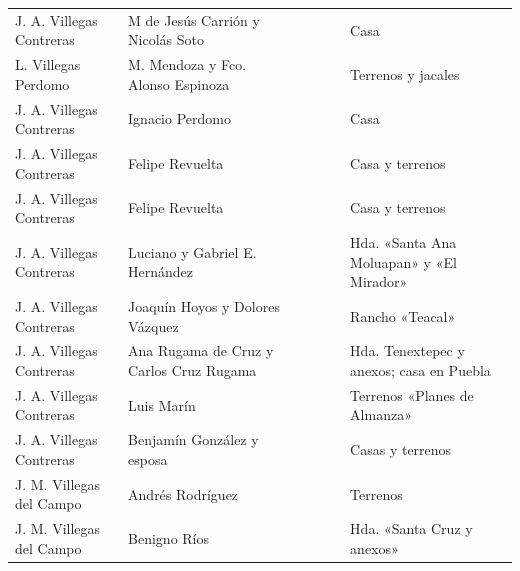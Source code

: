 \documentclass[14pt,twoside,final]{extbook} %
\begin{document}
{\begin{longtable}[c]{@{}p{2.5cm}lrSrrl@{}}
J. A. Villegas Contreras & M de Jesús Carrión y Nicolás Soto &  &  & {} & {} & Casa \\
L. Villegas Perdomo & M. Mendoza y Fco. Alonso Espinoza &  & {} & {} & {} & Terrenos y jacales \\
J. A. Villegas Contreras & Ignacio Perdomo &  &  &  &  & Casa \\
J. A. Villegas Contreras & Felipe Revuelta &  &  &  &  & Casa y terrenos \\
J. A. Villegas Contreras & Felipe Revuelta &  &  &  &  & Casa y terrenos \\
J. A. Villegas Contreras & Luciano y Gabriel E. Hernández &  &  &  &  & Hda. «Santa Ana Moluapan» y «El Mirador» \\
J. A. Villegas Contreras & Joaquín Hoyos y Dolores Vázquez &  &  & {} & {} & Rancho «Teacal» \\
J. A. Villegas Contreras & Ana Rugama de Cruz y Carlos Cruz Rugama &  &  &  &  & Hda. Tenextepec y anexos; casa en Puebla \\
J. A. Villegas Contreras & Luis Marín &  &  &  &  & Terrenos «Planes de Almanza» \\
J. A. Villegas Contreras & Benjamín González y esposa &  &  &  &  & Casas y terrenos \\
J. M. Villegas del Campo & Andrés Rodríguez &  &  &  &  & Terrenos \\
J. M. Villegas del Campo & Benigno Ríos &  &  &  &  & Hda. «Santa Cruz y anexos» \\

\end{longtable}}
\end{document}
